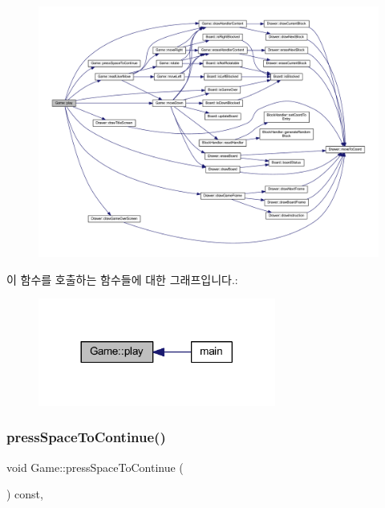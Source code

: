 \begin{figure}[H]
\begin{center}
\leavevmode
\includegraphics[width=350pt]{class_game_aa333825d0bca80e91e53c7e23f053405_cgraph}
\end{center}
\end{figure}
이 함수를 호출하는 함수들에 대한 그래프입니다.\+:
\nopagebreak
\begin{figure}[H]
\begin{center}
\leavevmode
\includegraphics[width=221pt]{class_game_aa333825d0bca80e91e53c7e23f053405_icgraph}
\end{center}
\end{figure}
\mbox{\label{class_game_a00e70c3fa536c8b76e92aaca66c5ccc2}} 
\subsubsection{\texorpdfstring{press\+Space\+To\+Continue()}{pressSpaceToContinue()}}
{\footnotesize\ttfamily void Game\+::press\+Space\+To\+Continue (\begin{DoxyParamCaption}{ }\end{DoxyParamCaption}) const\hspace{0.3cm}{\ttfamily [inline]}, {\ttfamily [private]}}



